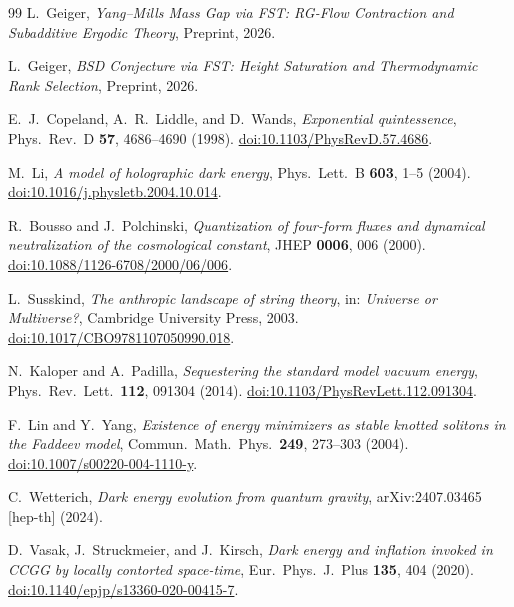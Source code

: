 \documentclass[12pt,a4paper]{article}
\theoremstyle{definition}
\theoremstyle{plain}
\theoremstyle{remark}
\begin{document}
\begin{thebibliography}{99}
L.~Geiger, \emph{Yang--Mills Mass Gap via FST: RG-Flow Contraction and Subadditive Ergodic Theory},
Preprint, 2026.

L.~Geiger, \emph{BSD Conjecture via FST: Height Saturation and Thermodynamic Rank Selection},
Preprint, 2026.

E.~J.~Copeland, A.~R.~Liddle, and D.~Wands,
\textit{Exponential quintessence},
Phys.\ Rev.\ D \textbf{57}, 4686--4690 (1998).
\href{https://doi.org/10.1103/PhysRevD.57.4686}{doi:10.1103/PhysRevD.57.4686}.

M.~Li,
\textit{A model of holographic dark energy},
Phys.\ Lett.\ B \textbf{603}, 1--5 (2004).
\href{https://doi.org/10.1016/j.physletb.2004.10.014}{doi:10.1016/j.physletb.2004.10.014}.

R.~Bousso and J.~Polchinski,
\textit{Quantization of four-form fluxes and dynamical neutralization of the cosmological constant},
JHEP \textbf{0006}, 006 (2000).
\href{https://doi.org/10.1088/1126-6708/2000/06/006}{doi:10.1088/1126-6708/2000/06/006}.

L.~Susskind,
\textit{The anthropic landscape of string theory},
in: \textit{Universe or Multiverse?}, Cambridge University Press, 2003.
\href{https://doi.org/10.1017/CBO9781107050990.018}{doi:10.1017/CBO9781107050990.018}.

N.~Kaloper and A.~Padilla,
\textit{Sequestering the standard model vacuum energy},
Phys.\ Rev.\ Lett.\ \textbf{112}, 091304 (2014).
\href{https://doi.org/10.1103/PhysRevLett.112.091304}{doi:10.1103/PhysRevLett.112.091304}.

F.~Lin and Y.~Yang,
\textit{Existence of energy minimizers as stable knotted solitons in the Faddeev model},
Commun.\ Math.\ Phys.\ \textbf{249}, 273--303 (2004).
\href{https://doi.org/10.1007/s00220-004-1110-y}{doi:10.1007/s00220-004-1110-y}.

C.~Wetterich,
\textit{Dark energy evolution from quantum gravity},
arXiv:2407.03465 [hep-th] (2024).

D.~Vasak, J.~Struckmeier, and J.~Kirsch,
\textit{Dark energy and inflation invoked in CCGG by locally contorted space-time},
Eur.\ Phys.\ J.\ Plus \textbf{135}, 404 (2020).
\href{https://doi.org/10.1140/epjp/s13360-020-00415-7}{doi:10.1140/epjp/s13360-020-00415-7}.

\end{thebibliography}
\end{document}
